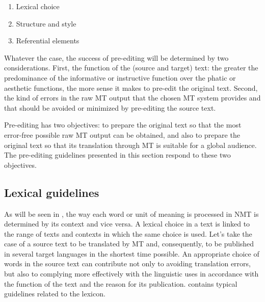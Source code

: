 \documentclass[output=paper,colorlinks,citecolor=brown,
]{langscibook}
\begin{document}
\begin{enumerate}
\item Lexical choice
\item Structure and style
\item Referential elements
\end{enumerate}

Whatever the case, the success of pre-editing will be determined by two considerations. First, the function of the (source and target) text: the greater the predominance of the informative or instructive function over the phatic or aesthetic functions, the more sense it makes to pre-edit the original text. Second, the kind of errors in the raw MT output that the chosen MT system provides and that should be avoided or minimized by pre-editing the source text. 

Pre-editing has two objectives: to prepare the original text so that the most error-free possible raw MT output can be obtained, and also to prepare the original text so that its translation through MT is suitable for a global audience. The pre-editing guidelines presented in this section respond to these two objectives.

\subsection{Lexical guidelines}

As will be seen in , the way each word or unit of meaning is processed in NMT is determined by its context and vice versa. A lexical choice in a text is linked to the range of texts and contexts in which the same choice is used. Let’s take the case of a source text to be translated by MT and, consequently, to be published in several target languages in the shortest time possible. An appropriate choice of words in the source text can contribute not only to avoiding translation errors, but also to complying more effectively with the linguistic uses in accordance with the function of the text and the reason for its publication.  contains typical guidelines related to the lexicon.
\end{document}
